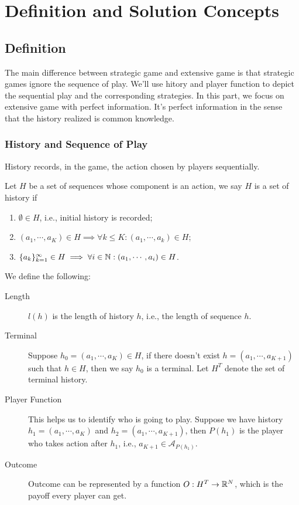 \section{Definition and Solution Concepts}
\subsection{Definition}
The main difference between strategic game and extensive game is that strategic games ignore the sequence of play. We'll use hitory and player function to depict the sequential play and the corresponding strategies.
In this part, we focus on extensive game with perfect information. It's perfect information in the sense that the history realized is common knowledge.

\subsubsection{History and Sequence of Play}
History records, in the game, the action chosen by players sequentially.
\begin{definition}[History]
    Let $H$ be a set of sequences whose component is an action, we say $H$ is a set of history if 
    \begin{enumerate}
        \item $\emptyset\in H$, i.e., initial history is recorded;
        \item $(a_1,\cdots,a_K)\in H \implies \forall k\leq K: (a_1,\cdots, a_k) \in H$;
        \item $\{a_k\}_{k=1}^{\infty}\in H \implies \forall i\in \mathbb{N}: (a_1,\cdots, a_i) \in H$.
    \end{enumerate}
\end{definition}

We define the following:
\begin{description}
    \item[Length] $l(h)$ is the length of history $h$, i.e., the length of sequence $h$.
    \item[Terminal] Suppose $h_0=(a_1,\cdots,a_K)\in H$, if there doesn't exist $h=(a_1,\cdots,a_{K+1})$ such that $h\in H$, then we say $h_0$ is a terminal. Let $H^T$ denote the set of terminal history.
    \item[Player Function] This helps us to identify who is going to play. Suppose we have history $h_1=(a_1,\cdots,a_K)$ and $h_2=(a_1,\cdots,a_{K+1})$, then $P(h_1)$ is the player who takes action after $h_1$, i.e., $a_{K+1} \in \mathcal{A}_{P(h_1)}$.
    \item[Outcome] Outcome can be represented by a function $O: H^T\to \mathbb{R}^N$, which is the payoff every player can get.
\end{description}

